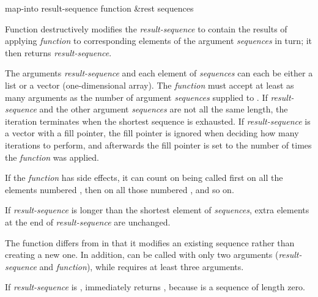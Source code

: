 \begin{defun}[Function]
map-into result-sequence function &rest sequences

Function  destructively modifies the \emph{result-sequence} to
contain the results of applying \emph{function} to corresponding elements of
    the argument \emph{sequences} in turn; it then
    returns \emph{result-sequence}.

    The arguments \emph{result-sequence}
    and each element of \emph{sequences} can each be
    either a list or a vector (one-dimensional array).
    The \emph{function} must accept at least as many arguments as the
    number of argument \emph{sequences} supplied to .
    If \emph{result-sequence} and
    the other argument \emph{sequences} are not all the same length, the iteration
    terminates when the shortest sequence is exhausted.  If \emph{result-sequence}
    is a vector with a fill pointer, the fill pointer is ignored when
    deciding how many iterations to perform, and afterwards the
    fill pointer is set to the number of times the \emph{function} was applied.

If the \emph{function} has side effects, it can count on being called
first on all the elements numbered , then on all those
numbered , and so on.

    If \emph{result-sequence} is longer than the shortest element of \emph{sequences},
    extra elements at the end of \emph{result-sequence} are unchanged.

    The function  differs from  in that it modifies
an existing sequence rather than creating a new one.  In addition,
 can be called with only two arguments (\emph{result-sequence}
and \emph{function}), while  requires at least three arguments.

If \emph{result-sequence} is ,  immediately returns
, because  is a sequence of length zero.
\end{defun}


